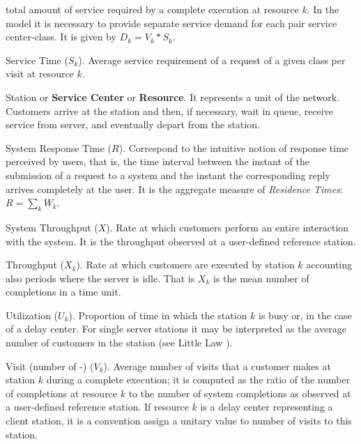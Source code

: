 \begin{description*}
total amount of service required  by a complete execution at
resource $k$. In the model it is necessary to provide separate
service demand for each pair service center-class. It is given by
$D_k = V_k * S_k$. \item[Service Time ($S_k$).] Average service
requirement of a request of a given class per visit at resource
$k$. \item[Station] or \textbf{Service Center} or
\textbf{Resource}. It represents a unit of the network. Customers
arrive at the station and then, if necessary, wait in queue,
receive service from server, and eventually depart from the
station. \item[System Response Time ($R$).] Correspond to the
intuitive notion of response time perceived by users, that is, the
time interval between the instant of the submission of a request
to a system and the instant the corresponding reply arrives
completely at the user. It is the aggregate measure of
\emph{Residence Times}: $R= \sum_k W_k$. \item[System Throughput
($X$).] Rate at which customers perform an entire interaction with
the system. It is the throughput observed at a user-defined
reference station. \item[Throughput ($X_k$).] Rate at which
customers are executed by station $k$ accounting also periods
where the server is idle. That is $X_k$ is the mean number of
completions in a time unit.
\item[Utilization ($U_k$).] Proportion of time in which the station $k$ is busy or, in the case of a delay center. For single server stations it may be interpreted as the average  number of  customers in the station (see Little Law \cite{Little}).
\item[Visit (number of -) ($V_k$).] Average number of visits that a customer makes at station $k$ during a complete execution; it is computed as the ratio of the number of completions at resource $k$ to the number of system completions as observed at a user-defined reference station. If resource $k$ is a delay center representing a client station, it is a convention assign a unitary value to number of visits to this station.
\end{description*}
%
